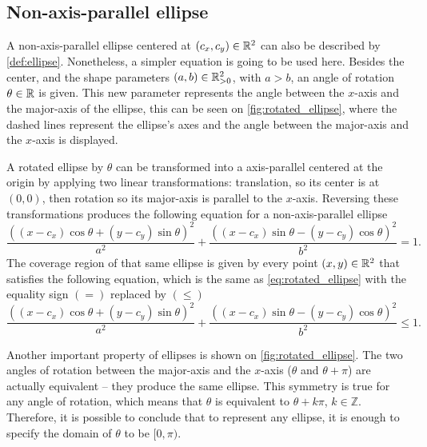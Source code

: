 \subsection{Non-axis-parallel ellipse}

A non-axis-parallel ellipse centered at $(c_x, c_y)\in\mathbb{R}^2$ can also be described by \autoref{def:ellipse}. Nonetheless, a simpler equation is going to be used here. Besides the center, and the shape parameters $(a, b) \in \mathbb{R}^2_{>0}$, with $a > b$, an angle of rotation $\theta \in \mathbb{R}$ is given. This new parameter represents the angle between the $x$-axis and the major-axis of the ellipse, this can be seen on \autoref{fig:rotated_ellipse}, where the dashed lines represent the ellipse's axes and the angle between the major-axis and the $x$-axis is displayed.

A rotated ellipse by $\theta$ can be transformed into a axis-parallel centered at the origin by applying two linear transformations: translation, so its center is at $(0, 0)$, then rotation so its major-axis is parallel to the $x$-axis. Reversing these transformations produces the following equation for a non-axis-parallel ellipse
\begin{equation}\label{eq:rotated_ellipse}
\dfrac{((x-c_x)\cos\theta + (y-c_y)\sin\theta)^2}{a^2}+\dfrac{((x-c_x)\sin\theta - (y-c_y)\cos\theta)^2}{b^2}=1.
\end{equation}
The coverage region of that same ellipse is given by every point $(x, y)\in\mathbb{R}^2$ that satisfies the following equation, which is the same as \autoref{eq:rotated_ellipse} with the equality sign $(=)$ replaced by $(\le)$
\begin{equation}\label{eq:rotated_ellipse_co}
\dfrac{((x-c_x)\cos\theta + (y-c_y)\sin\theta)^2}{a^2}+\dfrac{((x-c_x)\sin\theta - (y-c_y)\cos\theta)^2}{b^2}\le 1.
\end{equation}

Another important property of ellipses is shown on \autoref{fig:rotated_ellipse}. The two angles of rotation between the major-axis and the $x$-axis ($\theta$ and $\theta+\pi$) are actually equivalent -- they produce the same ellipse. This symmetry is true for any angle of rotation, which means that $\theta$ is equivalent to $\theta+k\pi$, $k\in\mathbb{Z}$. Therefore, it is possible to conclude that to represent any ellipse, it is enough to specify the domain of $\theta$ to be $[0, \pi)$.

